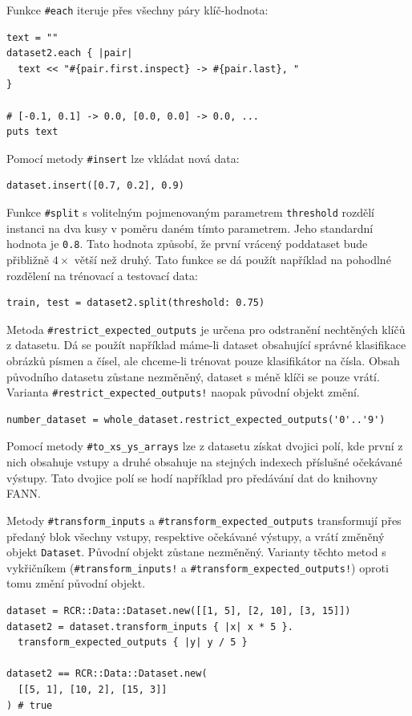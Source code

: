 \documentclass[a4paper]{article}
\begin{document}
Funkce \texttt{\#each} iteruje přes všechny páry klíč-hodnota:
\begin{lstlisting}
text = ""
dataset2.each { |pair|
  text << "#{pair.first.inspect} -> #{pair.last}, "
}

# [-0.1, 0.1] -> 0.0, [0.0, 0.0] -> 0.0, ...
puts text
\end{lstlisting}

Pomocí metody \texttt{\#insert} lze vkládat nová data:
\begin{lstlisting}
dataset.insert([0.7, 0.2], 0.9)
\end{lstlisting}

Funkce \texttt{\#split} s volitelným pojmenovaným parametrem \texttt{threshold}
rozdělí instanci na dva kusy v poměru daném tímto parametrem. Jeho standardní
hodnota je \texttt{0.8}. Tato hodnota způsobí, že první vrácený poddataset bude
přibližně $4\times$ větší než druhý.
Tato funkce se dá použít například na pohodlné rozdělení na trénovací a
testovací data:
\begin{lstlisting}
train, test = dataset2.split(threshold: 0.75)
\end{lstlisting}

Metoda \texttt{\#restrict\_expected\_outputs} je určena pro odstranění nechtěných klíčů
z datasetu. Dá se použít například máme-li dataset obsahující správné klasifikace
obrázků písmen a čísel, ale chceme-li trénovat pouze klasifikátor na čísla.
Obsah původního datasetu zůstane nezměněný, dataset s méně klíči se pouze vrátí.
Varianta \texttt{\#restrict\_expected\_outputs!} naopak původní objekt změní.
\begin{lstlisting}
number_dataset = whole_dataset.restrict_expected_outputs('0'..'9')
\end{lstlisting}

Pomocí metody \texttt{\#to\_xs\_ys\_arrays} lze z datasetu získat dvojici polí,
kde první z nich obsahuje vstupy a druhé obsahuje na stejných indexech příslušné
očekávané výstupy. Tato dvojice polí se hodí například pro předávání dat do
knihovny FANN.

Metody \texttt{\#transform\_inputs} a \texttt{\#transform\_expected\_outputs} transformují
přes předaný blok všechny vstupy, respektive očekávané výstupy, a vrátí změněný
objekt \texttt{Dataset}. Původní objekt zůstane nezměněný.
Varianty těchto metod s vykřičníkem (\texttt{\#transform\_inputs!} a
\texttt{\#transform\_expected\_outputs!}) oproti tomu změní původní objekt.
\begin{lstlisting}
dataset = RCR::Data::Dataset.new([[1, 5], [2, 10], [3, 15]])
dataset2 = dataset.transform_inputs { |x| x * 5 }.
  transform_expected_outputs { |y| y / 5 }

dataset2 == RCR::Data::Dataset.new(
  [[5, 1], [10, 2], [15, 3]]
) # true
\end{lstlisting}
\end{document}
